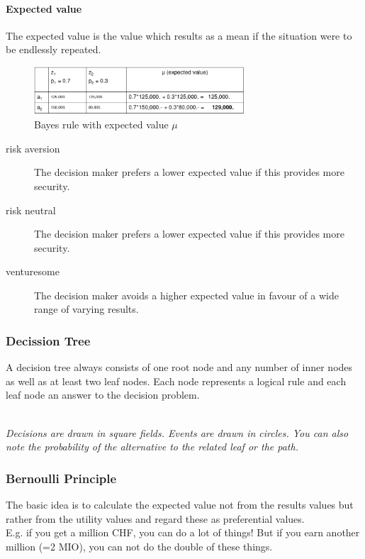 \paragraph{Expected value} The expected value is the value which results
as a mean if the situation were to be endlessly repeated.

\begin{figure}[H]
\centering
\includegraphics[width=0.7\textwidth]{figures/bayesRule.png}
\caption{Bayes rule with expected value $\mu$}
\end{figure}

\begin{description}
	\item[risk aversion] The decision maker prefers a lower expected
	value if this provides more security.
	\item[risk neutral] The decision maker prefers a lower expected
	value if this provides more security.
	\item[venturesome] The decision maker avoids a higher expected value
	in favour of a wide range of varying results.
\end{description}

\subsubsection{Decission Tree}

A decision tree always consists of one root node and any number of inner
nodes as well as at least two leaf nodes. Each node represents a logical
rule and each leaf node an answer to the decision problem.

\mbox{}\\
\emph{Decisions are drawn in square fields. Events are drawn in circles. You can also note the probability of the alternative to the related leaf or the path.}

\subsubsection{Bernoulli Principle}

The basic idea is to calculate the expected value not from the results
values but rather from the utility values and regard these as preferential
values.\\
E.g. if you get a million CHF, you can do a lot of things! But if you
earn another million (=2 MIO), you can not do the double of these
things.

